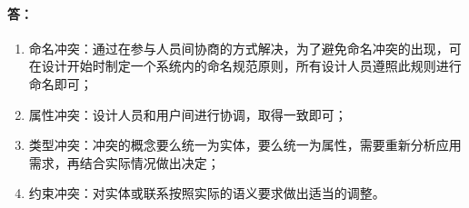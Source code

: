 \paragraph{答：}
\begin{enumerate}
	\item 命名冲突：通过在参与人员间协商的方式解决，为了避免命名冲突的出现，可在设计开始时制定一个系统内的命名规范原则，所有设计人员遵照此规则进行命名即可；
	\item 属性冲突：设计人员和用户间进行协调，取得一致即可；
	\item 类型冲突：冲突的概念要么统一为实体，要么统一为属性，需要重新分析应用需求，再结合实际情况做出决定；
	\item 约束冲突：对实体或联系按照实际的语义要求做出适当的调整。
\end{enumerate}